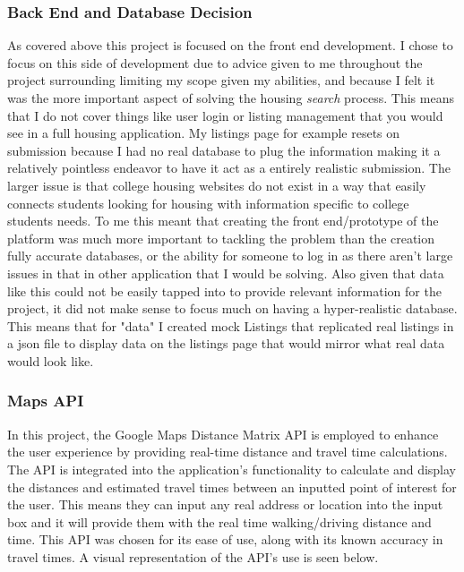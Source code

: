 \documentclass[10pt,twocolumn]{article}
\begin{document}
\subsubsection{Back End and Database Decision}
As covered above this project is focused on the front end development. I chose to focus on this side of development due to advice given to me throughout the project surrounding limiting my scope given my abilities, and because I felt it was the more important aspect of solving the housing \textit{search} process. This means that I do not cover things like user login or listing management that you would see in a full housing application. My listings page for example resets on submission because I had no real database to plug the information making it a relatively pointless endeavor to have it act as a entirely realistic submission. The larger issue is that college housing websites do not exist in a way that easily connects students looking for housing with information specific to college students needs. To me this meant that creating the front end/prototype of the platform was much more important to tackling the problem than the creation fully accurate databases, or the ability for someone to log in as there aren't large issues in that in other application that I would be solving. Also given that data like this could not be easily tapped into to provide relevant information for the project, it did not make sense to focus much on having a hyper-realistic database. This means that for "data" I created mock Listings that replicated real listings in a json file to display data on the listings page that would mirror what real data would look like. 

\subsubsection{Maps API}
In this project, the Google Maps Distance Matrix API is employed to enhance the user experience by providing real-time distance and travel time calculations. The API is integrated into the application's functionality to calculate and display the distances and estimated travel times between an inputted point of interest for the user. This means they can input any real address or location into the input box and it will provide them with the real time walking/driving distance and time. This API was chosen for its ease of use, along with its known accuracy in travel times. A visual representation of the API's use is seen below. \\
\end{document}
